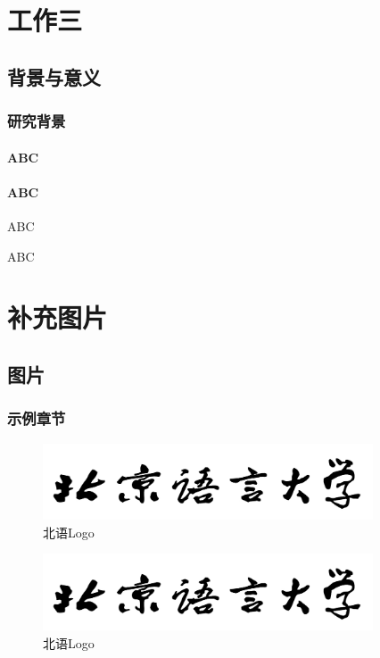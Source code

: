 \documentclass[doctor,final,twoside]{blcuthesis}
\begin{document}
	\chapter{工作三}
	\section{背景与意义}
	\subsection{研究背景}
	\subsubsection{ABC}
	\subsubsection{ABC}
	ABC\citet{Xiang:20}
	
	ABC\citep{Xiang:20}
	
	\nocite{*}
	\printbibliography[heading=bibintoc]
	
	\appendix
	
	\chapter{补充图片}
	\section{图片}
	\subsection{示例章节}
	\begin{figure}[h]
		\centering
		\includegraphics[width=9.8cm]{figures/BLCULogoText.png}
		\caption{北语Logo}
	\end{figure}
	
	\begin{figure}[h]
		\centering
		\includegraphics[width=9.8cm]{figures/BLCULogoText.png}
		\caption{北语Logo}
	\end{figure}
\end{document}
